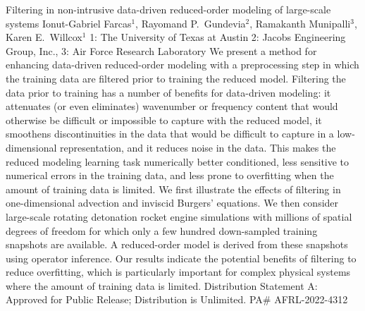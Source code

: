 \vspace{1.5ex}
\abs
{Filtering in non-intrusive data-driven reduced-order modeling of large-scale systems}
{Ionut-Gabriel Farcas$^{1}$, Rayomand P.~Gundevia$^{2}$, Ramakanth Munipalli$^{3}$, Karen E.~Willcox$^{1}$}
{1: The University of Texas at Austin 2: Jacobs Engineering Group, Inc., 3: Air Force Research Laboratory}
{We present a method for enhancing data-driven reduced-order modeling with a preprocessing step in which the training data are filtered prior to training the reduced model.
Filtering the data prior to training has a number of benefits for data-driven modeling: it attenuates (or even eliminates) wavenumber or frequency content that would otherwise be difficult or impossible to capture with the reduced model, it smoothens discontinuities in the data that would be difficult to capture in a low-dimensional representation, and it reduces noise in the data.
This makes the reduced modeling learning task numerically better conditioned, less sensitive to numerical errors in the training data, and less prone to overfitting when the amount of training data is limited.
We first illustrate the effects of filtering in one-dimensional advection and inviscid Burgers' equations.
We then consider large-scale rotating detonation rocket engine simulations with millions of spatial degrees of freedom for which only a few hundred down-sampled training snapshots are available.
A reduced-order model is derived from these snapshots using operator inference.
Our results indicate the potential benefits of filtering to reduce overfitting, which is particularly important for complex physical systems where the amount of training data is limited.
\newline
\noindent Distribution Statement A: Approved for Public Release; Distribution is Unlimited. PA$\#$ AFRL-2022-4312
}


